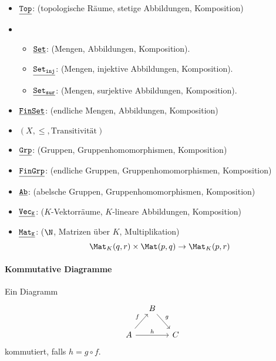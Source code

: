 \begin{ex}
	\begin{itemize}
		\item
			$\underline{\mathtt{Top}}$: (topologische Räume, stetige Abbildungen, Komposition)
		\item
			\begin{itemize}
				\item
					$\underline{\mathtt{Set}}$: (Mengen, Abbildungen, Komposition).
				\item
					$\underline{\mathtt{Set_{inj}}}$: (Mengen, injektive Abbildungen, Komposition).
				\item
					$\underline{\mathtt{Set_{sur}}}$: (Mengen, surjektive Abbildungen, Komposition).
			\end{itemize}
		\item
			$\underline{\mathtt{FinSet}}$: (endliche Mengen, Abbildungen, Komposition)
		\item
			$(X, \le, \text{Transitivität})$
		\item
			$\underline{\mathtt{Grp}}$: (Gruppen, Gruppenhomomorphismen, Komposition)
		\item
			$\underline{\mathtt{FinGrp}}$: (endliche Gruppen, Gruppenhomomorphismen, Komposition)
		\item
			$\underline{\mathtt{Ab}}$: (abelsche Gruppen, Gruppenhomomorphismen, Komposition)
		\item
			$\underline{\mathtt{Vec_K}}$: ($K$-Vektorräume, $K$-lineare Abbildungen, Komposition)
		\item
			$\underline{\mathtt{Mat_K}}$: ($\N$, Matrizen über $K$, Multiplikation)
			\[
				\Mat_K(q,r) \times \Mat(p,q) \to \Mat_K(p,r)
			\]
	\end{itemize}
\end{ex}

\paragraph{Kommutative Diagramme}

Ein Diagramm
\[
	\begin{tikzcd}[column sep=small]
		& B \arrow{dr}{g} & \\
		A \arrow{ur}{f} \arrow{rr}{h} & & C
	\end{tikzcd}
\]
kommutiert, falls $h = g \circ f$.

